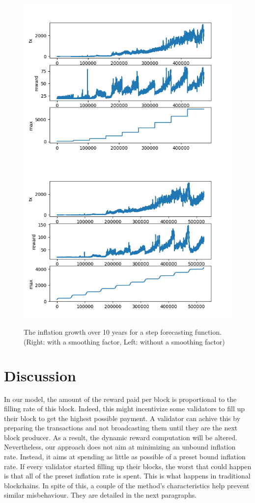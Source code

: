 \documentclass[conference]{IEEEtran}
\begin{document}
\begin{figure}[]
	\includegraphics[width=0.49\linewidth, trim= 0cm 0cm 0cm 0cm, clip]{Figures/Figure_steps.png}
	\includegraphics[width=0.49\linewidth, trim= 0cm 0cm 0cm 0cm, clip]{Figures/Figure_steps_smooth.png}
	\caption{The inflation growth over 10 years for a step forecasting function. (Right: with a smoothing factor, Left: without a smoothing factor)}
	\label{fig:sim}
\end{figure}

\section{Discussion}
In our model, the amount of the reward paid per block is proportional to the filling rate of this block. Indeed, this might incentivize some validators to fill up their block to get the highest possible payment. A validator can achive this by preparing the transactions and not broadcasting them until they are the next block producer. As a result, the dynamic reward computation will be altered. Nevertheless, our approach does not aim at minimizing an unbound inflation rate. Instead, it aims at spending as little as possible of a preset bound inflation rate. If every validator started filling up their blocks, the worst that could happen is that all of the preset inflation rate is spent. This is what happens in traditional blockchains. In spite of this, a couple of the method's characteristics help prevent similar misbehaviour. They are detailed in the next paragraphs.
\end{document}
